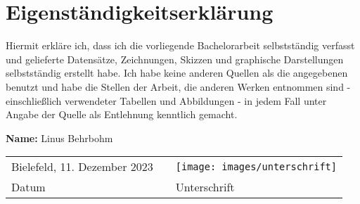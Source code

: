 \section*{Eigenständigkeitserklärung}

Hiermit erkläre ich, dass ich die vorliegende Bachelorarbeit selbstständig verfasst und gelieferte Datensätze, Zeichnungen, Skizzen und graphische Darstellungen selbstständig erstellt habe. Ich habe keine anderen Quellen als die angegebenen benutzt und habe die Stellen der Arbeit, die anderen Werken entnommen sind - einschließlich verwendeter Tabellen und Abbildungen - in jedem Fall unter Angabe der Quelle als Entlehnung kenntlich gemacht.


\vspace{2cm} 
{\bf Name:} Linus Behrbohm 
\vspace{2cm} 

{\setlength{\extrarowheight}{5pt}
\begin{tabular}{lp{2em}l} 
Bielefeld, 11. Dezember 2023   && \texttt{[image: images/unterschrift]}\\ \cline{1-1}\cline{3-3}
   Datum && Unterschrift 
\end{tabular}
}
\newpage
